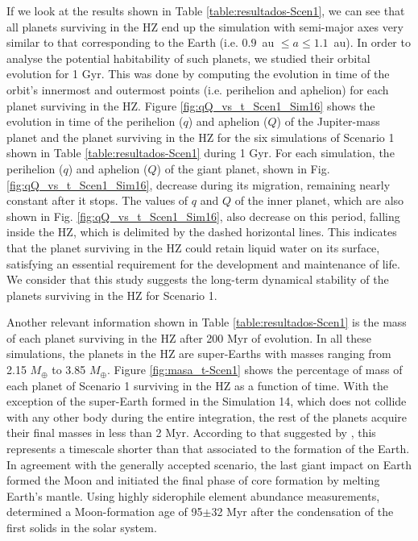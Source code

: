 \documentclass{aa}
\begin{document}
If we look at the results shown in Table \ref{table:resultados-Scen1}, we can see that all planets surviving in the HZ end up the simulation with semi-major axes very similar to that corresponding to the Earth (i.e. $0.9$~au $\leq a \leq 1.1$~au). In order to analyse the potential habitability of such planets, we studied their orbital evolution for 1 Gyr.
This was done by computing the evolution in time of the orbit's innermost and outermost points (i.e. perihelion and aphelion)
for each planet surviving in the HZ.
Figure \ref{fig:qQ_vs_t_Scen1_Sim16} shows the evolution in time of the perihelion ($q$) and aphelion ($Q$) of the Jupiter-mass planet
and the planet surviving in the HZ for the six simulations of Scenario 1 shown in Table \ref{table:resultados-Scen1}
during 1 Gyr. For each simulation, the perihelion ($q$) and aphelion ($Q$) of the giant planet, shown in Fig. \ref{fig:qQ_vs_t_Scen1_Sim16}, decrease during its migration, remaining nearly constant after it stops. The values of $q$ and
$Q$ of the inner planet, which are also shown in Fig. \ref{fig:qQ_vs_t_Scen1_Sim16}, also decrease on this period,
falling inside the HZ, which is delimited by the dashed horizontal lines. This indicates that the planet surviving
in the HZ could retain liquid water on its surface, satisfying an essential requirement for the development and maintenance of life. We consider that this study suggests the long-term dynamical stability of the planets surviving in the HZ for Scenario 1.

Another relevant information shown in Table \ref{table:resultados-Scen1} is the mass of each planet surviving in the HZ after
200 Myr of evolution. In all these simulations, the planets in the HZ are super-Earths with masses ranging from
2.15 $M_\oplus$ to 3.85 $M_\oplus$.
Figure \ref{fig:masa_t-Scen1} shows the percentage of mass of each planet of Scenario 1 surviving in the HZ as a function of time.
With the exception of the super-Earth formed in the Simulation 14, which does not collide with any other body during the entire
integration, the rest of the planets acquire their final masses in less than 2 Myr. According to that suggested by \citet{Jacobson2014}, this represents a timescale shorter than that associated to the formation of the Earth. In agreement with the
generally accepted scenario, the last giant impact on Earth formed the Moon and initiated the final phase of core formation by melting
Earth's mantle. Using highly siderophile element abundance measurements, \citet{Jacobson2014} determined a Moon-formation
age of 95$\pm$32 Myr after the condensation of the first solids in the solar system.
\end{document}
